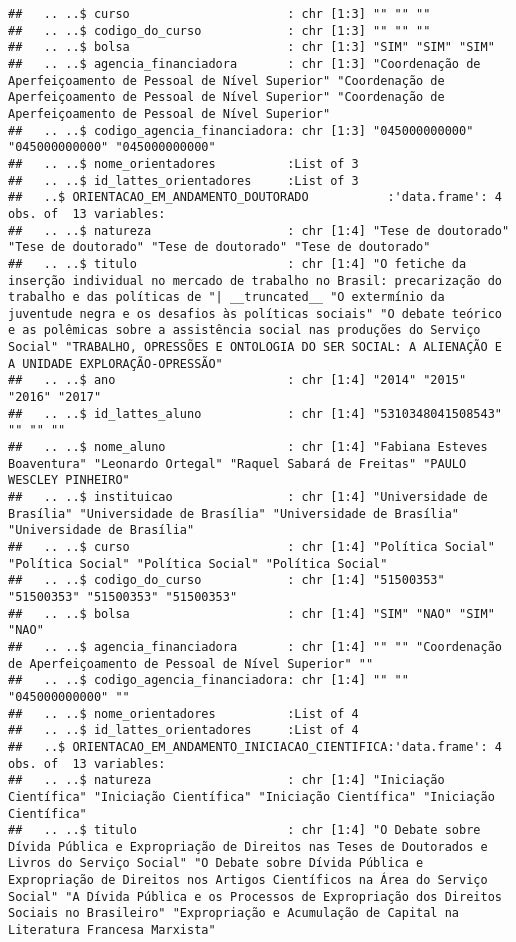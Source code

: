 \documentclass[]{article}
\begin{document}
\begin{verbatim}
##   .. ..$ curso                      : chr [1:3] "" "" ""
##   .. ..$ codigo_do_curso            : chr [1:3] "" "" ""
##   .. ..$ bolsa                      : chr [1:3] "SIM" "SIM" "SIM"
##   .. ..$ agencia_financiadora       : chr [1:3] "Coordenação de Aperfeiçoamento de Pessoal de Nível Superior" "Coordenação de Aperfeiçoamento de Pessoal de Nível Superior" "Coordenação de Aperfeiçoamento de Pessoal de Nível Superior"
##   .. ..$ codigo_agencia_financiadora: chr [1:3] "045000000000" "045000000000" "045000000000"
##   .. ..$ nome_orientadores          :List of 3
##   .. ..$ id_lattes_orientadores     :List of 3
##   ..$ ORIENTACAO_EM_ANDAMENTO_DOUTORADO           :'data.frame': 4 obs. of  13 variables:
##   .. ..$ natureza                   : chr [1:4] "Tese de doutorado" "Tese de doutorado" "Tese de doutorado" "Tese de doutorado"
##   .. ..$ titulo                     : chr [1:4] "O fetiche da inserção individual no mercado de trabalho no Brasil: precarização do trabalho e das políticas de "| __truncated__ "O extermínio da juventude negra e os desafios às políticas sociais" "O debate teórico e as polêmicas sobre a assistência social nas produções do Serviço Social" "TRABALHO, OPRESSÕES E ONTOLOGIA DO SER SOCIAL: A ALIENAÇÃO E A UNIDADE EXPLORAÇÃO-OPRESSÃO"
##   .. ..$ ano                        : chr [1:4] "2014" "2015" "2016" "2017"
##   .. ..$ id_lattes_aluno            : chr [1:4] "5310348041508543" "" "" ""
##   .. ..$ nome_aluno                 : chr [1:4] "Fabiana Esteves Boaventura" "Leonardo Ortegal" "Raquel Sabará de Freitas" "PAULO WESCLEY PINHEIRO"
##   .. ..$ instituicao                : chr [1:4] "Universidade de Brasília" "Universidade de Brasília" "Universidade de Brasília" "Universidade de Brasília"
##   .. ..$ curso                      : chr [1:4] "Política Social" "Política Social" "Política Social" "Política Social"
##   .. ..$ codigo_do_curso            : chr [1:4] "51500353" "51500353" "51500353" "51500353"
##   .. ..$ bolsa                      : chr [1:4] "SIM" "NAO" "SIM" "NAO"
##   .. ..$ agencia_financiadora       : chr [1:4] "" "" "Coordenação de Aperfeiçoamento de Pessoal de Nível Superior" ""
##   .. ..$ codigo_agencia_financiadora: chr [1:4] "" "" "045000000000" ""
##   .. ..$ nome_orientadores          :List of 4
##   .. ..$ id_lattes_orientadores     :List of 4
##   ..$ ORIENTACAO_EM_ANDAMENTO_INICIACAO_CIENTIFICA:'data.frame': 4 obs. of  13 variables:
##   .. ..$ natureza                   : chr [1:4] "Iniciação Científica" "Iniciação Científica" "Iniciação Científica" "Iniciação Científica"
##   .. ..$ titulo                     : chr [1:4] "O Debate sobre Dívida Pública e Expropriação de Direitos nas Teses de Doutorados e Livros do Serviço Social" "O Debate sobre Dívida Pública e Expropriação de Direitos nos Artigos Científicos na Área do Serviço Social" "A Dívida Pública e os Processos de Expropriação dos Direitos Sociais no Brasileiro" "Expropriação e Acumulação de Capital na Literatura Francesa Marxista"

\end{verbatim}
\end{document}

